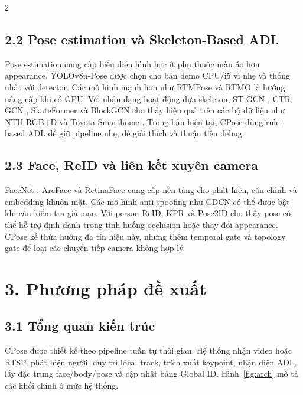 \documentclass[a4paper, twoside, 10pt]{article}
\begin{document}
\begin{multicols}{2}
\subsection*{2.2 Pose estimation và Skeleton-Based ADL}
Pose estimation cung cấp biểu diễn hình học ít phụ thuộc màu áo hơn appearance. YOLOv8n-Pose \cite{key2} được chọn cho bản demo CPU/i5 vì nhẹ và thống nhất với detector. Các mô hình mạnh hơn như RTMPose \cite{key54} và RTMO \cite{key55} là hướng nâng cấp khi có GPU. Với nhận dạng hoạt động dựa skeleton, ST-GCN \cite{key8}, CTR-GCN \cite{key10}, SkateFormer \cite{key12} và BlockGCN \cite{key56} cho thấy hiệu quả trên các bộ dữ liệu như NTU RGB+D \cite{key6} và Toyota Smarthome \cite{key7}. Trong bản hiện tại, CPose dùng rule-based ADL để giữ pipeline nhẹ, dễ giải thích và thuận tiện debug.

\subsection*{2.3 Face, ReID và liên kết xuyên camera}
FaceNet \cite{key27}, ArcFace \cite{key28} và RetinaFace \cite{key32} cung cấp nền tảng cho phát hiện, căn chỉnh và embedding khuôn mặt. Các mô hình anti-spoofing như CDCN \cite{key50} có thể được bật khi cần kiểm tra giả mạo. Với person ReID, KPR \cite{key52} và Pose2ID \cite{key53} cho thấy pose có thể hỗ trợ định danh trong tình huống occlusion hoặc thay đổi appearance. CPose kế thừa hướng đa tín hiệu này, nhưng thêm temporal gate và topology gate để loại các chuyển tiếp camera không hợp lý.

\section*{3. Phương pháp đề xuất}
\subsection*{3.1 Tổng quan kiến trúc}
CPose được thiết kế theo pipeline tuần tự thời gian. Hệ thống nhận video hoặc RTSP, phát hiện người, duy trì local track, trích xuất keypoint, nhận diện ADL, lấy đặc trưng face/body/pose và cập nhật bảng Global ID. Hình~\ref{fig:arch} mô tả các khối chính ở mức hệ thống.


\end{multicols}
\end{document}
